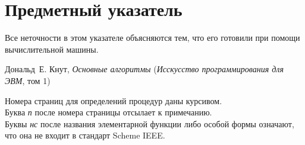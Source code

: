 \chapter*{Предметный указатель}
\epigraph{
Все неточности в этом указателе объясняются тем, что его готовили при
помощи вычислительной машины.
}{
Дональд~Е. Кнут, {\it Основные алгоритмы} ({\it Исскусство
  программирования для ЭВМ}, том 1)
}

\noindent
Номера страниц для определений процедур даны курсивом.\\
Буква {\it п} после номера страницы отсылает к примечанию.\\
Буквы {\it нс} после названия элементарной функции либо особой формы
означают, что она не входит в стандарт Scheme IEEE.\\


